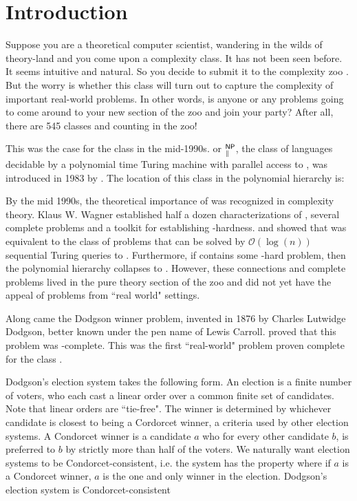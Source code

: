 \section{Introduction}\label{sec:intro}

    Suppose you are a theoretical computer scientist, wandering in the wilds
of theory-land and you come upon a complexity class.
It has not been seen before.
It seems intuitive and natural.
So you decide to submit it to the complexity zoo \citep{zoo}.
But the worry is whether this class will turn out to capture the complexity
of important real-world problems.
In other words, is anyone or any problems going to come around to your new
section of the zoo and join your party?
After all, there are 545 classes and counting
in the zoo!

This was the case for the class \tp in the mid-1990s.
\tp or $^{\mathsf{NP}}_{\parallel}$, the class of
languages decidable by a polynomial time Turing machine with parallel access to
\np, was introduced in 1983 by \citep{PZ83}.
The location of this class in the polynomial hierarchy is:





By the mid 1990s, the theoretical importance of \tp was recognized in complexity theory.
Klaus W. Wagner established half a dozen characterizations of \tp \citep{wag90},
several complete problems and a toolkit for establishing \tp-hardness.
\citet{hem87} and \citet{ksw87} showed that \tp was equivalent to the class of
problems that can be solved by $\mathcal{O}(\log(n))$ sequential Turing queries to \np.
Furthermore, if \np contains some \tp-hard problem, then the polynomial hierarchy
collapses to \np.
However, these connections and complete problems
lived in the pure theory section of the zoo and did not yet have the appeal of
problems from ``real world" settings.

Along came the Dodgson winner problem, invented in 1876 by Charles Lutwidge
Dodgson, better known under the pen name of Lewis Carroll.
\citet{exactdodgson} proved that this problem was \tp-complete.
This was the first ``real-world" problem proven complete for the class \tp.

Dodgson's election system takes the following form.
An election is a finite number of voters, who each cast a linear order
over a common finite set of candidates.
Note that linear orders are ``tie-free".
The winner is determined by whichever candidate is closest to being a Cordorcet
winner, a criteria used by other election systems.
A Condorcet winner is a candidate $a$ who for every other candidate $b$, is
preferred to $b$ by strictly more than half of the voters.
We naturally want election systems to be Condorcet-consistent, i.e. the system
has the property where if $a$ is a Condorcet winner, $a$ is the one and only
winner in the election.
Dodgson's election system is Condorcet-consistent \citep{handbookcss}

